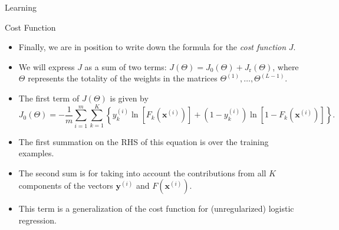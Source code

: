 \documentclass[8pt,american]{beamer}
\begin{document}
\begin{frame}{Learning}

\begin{block}{Cost Function}
\begin{itemize}
\justifying
\item Finally, we are in position to write down the formula for the
  \textit{cost function} $J$.
\item We will express $J$ as a sum of two terms:
  $J\left(\Theta\right)=J_{0}\left(\Theta\right)+J_{\mathrm{r}}\left(\Theta\right)$,
  where $\Theta$ represents the totality of the weights in the matrices
  $\Theta^{\left(1\right)},\ldots,\Theta^{\left(L-1\right)}$.
\item The first term of $J\left(\Theta\right)$ is given by
  \begin{equation}
  J_{0}\left(\Theta\right)=-\frac{1}{m}\sum_{i=1}^{m}\sum_{k=1}^{K}\left\{y_{k}^{\left(i\right)}\ln\left[F_{k}\left(\mathbf{x}^{\left(i\right)}\right)\right]+\left(1-y_{k}^{\left(i\right)}\right)\ln\left[1-F_{k}\left(\mathbf{x}^{\left(i\right)}\right)\right]\right\}.
  \end{equation}
\item The first summation on the RHS of this equation is over the training
  examples.
\item The second sum is for taking into account the contributions from all $K$
  components of the vectors $\mathbf{y}^{\left(i\right)}$ and
  $F\left(\mathbf{x}^{\left(i\right)}\right)$.
\item This term is a generalization of the cost function for (unregularized)
  logistic regression.
\end{itemize}
\end{block}

\end{frame}
\end{document}
